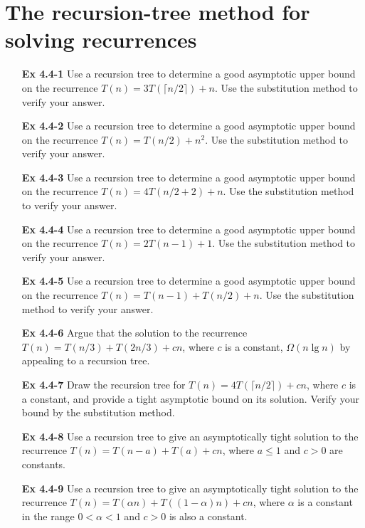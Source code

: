 \documentclass[fontsize=12pt,paper=a4]{book}
\begin{document}
\section{The recursion-tree method for solving recurrences}
\begin{enumerate}
	\item[\textbf{Ex 4.4-1}]
		Use a recursion tree to determine a good asymptotic upper bound on the recurrence $T(n) = 3T(\lceil n/2 \rceil) + n$. Use the substitution method to verify your answer.

	\item[\textbf{Ex 4.4-2}]
		Use a recursion tree to determine a good asymptotic upper bound on the recurrence $T(n) = T(n/2) + n^2$. Use the substitution method to verify your answer.

	\item[\textbf{Ex 4.4-3}]
		Use a recursion tree to determine a good asymptotic upper bound on the recurrence $T(n) = 4T(n/2+2) + n$. Use the substitution method to verify your answer.

	\item[\textbf{Ex 4.4-4}]
		Use a recursion tree to determine a good asymptotic upper bound on the recurrence $T(n) = 2T(n-1) + 1$. Use the substitution method to verify your answer.

	\item[\textbf{Ex 4.4-5}]
		Use a recursion tree to determine a good asymptotic upper bound on the recurrence $T(n) = T(n-1) + T(n/2) + n$. Use the substitution method to verify your answer.

	\item[\textbf{Ex 4.4-6}]
		Argue that the solution to the recurrence $T(n) = T(n/3) + T(2n/3) + cn$, where $c$ is a constant, $\Omega(n \lg n)$ by appealing to a recursion tree.

	\item[\textbf{Ex 4.4-7}]
		Draw the recursion tree for $T(n) = 4T(\lceil n/2 \rceil) + cn$, where $c$ is a constant, and provide a tight asymptotic bound on its solution. Verify your bound by the substitution method.

	\item[\textbf{Ex 4.4-8}]
		Use a recursion tree to give an asymptotically tight solution to the recurrence $T(n) = T(n-a) + T(a) + cn$, where $a \leq 1$ and $c> 0$ are constants.

	\item[\textbf{Ex 4.4-9}]
		Use a recursion tree to give an asymptotically tight solution to the recurrence $T(n) = T(\alpha n) + T((1 - \alpha)n) + cn$, where $\alpha$ is a constant in the range $0< \alpha <1$ and $c > 0$ is also a constant.
\end{enumerate}
\end{document}
